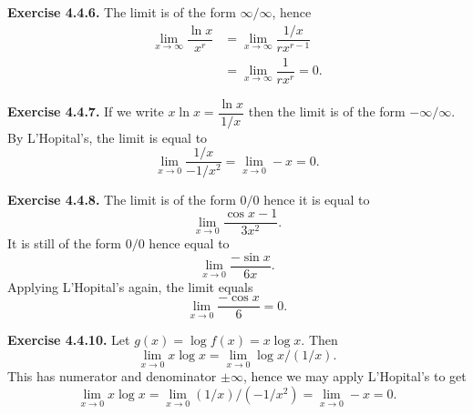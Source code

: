 \documentclass[12pt]{book}
\newenvironment{exercise}[2][Exercise]{\begin{trivlist}
\item[\hskip \labelsep {\bfseries #1}\hskip \labelsep {\bfseries #2.}]}{\end{trivlist}}
\newcommand{\prb}[1]{\textbf{Exercise #1.}}
\begin{document}
\begin{exercise}{4.4.5}
\end{exercise}



\prb{4.4.6} The limit is of the form $\infty/\infty$, hence \begin{align*}
\lim_{x \rightarrow \infty} \dfrac{\ln x}{x^r} & = \lim_{x \rightarrow \infty} \dfrac{1/x}{rx^{r-1}} \\
& = \lim_{x \rightarrow \infty} \dfrac{1}{rx^{r}} = 0. \end{align*}

\prb{4.4.7} If we write $x \ln x = \dfrac{\ln x}{1/x}$ then the limit is of the form $-\infty/\infty$. By L'Hopital's, the limit is equal to $$\lim_{x \rightarrow 0} \dfrac{1/x}{-1/x^2} = \lim_{x \rightarrow 0} -x = 0.$$

\prb{4.4.8} The limit is of the form $0/0$ hence it is equal to $$\lim_{x \rightarrow 0} \dfrac{\cos x - 1}{3x^2}.$$ It is still of the form $0/0$ hence equal to $$\lim_{x \rightarrow 0} \dfrac{-\sin x }{6x}.$$ Applying L'Hopital's again, the limit equals $$\lim_{x \rightarrow 0} \dfrac{-\cos x }{6} = 0.$$



\begin{exercise}{4.4.9}
\end{exercise}


\prb{4.4.10} Let $g(x) = \log f(x) = x \log x.$ Then $$\lim_{x \rightarrow 0} x \log x = \lim_{x \rightarrow 0} \log x /(1/x).$$ This has numerator and denominator $\pm \infty$, hence we may apply L'Hopital's to get $$\lim_{x \rightarrow 0} x \log x = \lim_{x \rightarrow 0} (1/x)/(-1/x^2) = \lim_{x \rightarrow 0} - x = 0.$$


\begin{exercise}{4.4.11}
\end{exercise}

\begin{exercise}{4.4.12}
\end{exercise}


\begin{exercise}{4.4.13}
\end{exercise}


\begin{exercise}{4.4.14}
\end{exercise}

\begin{exercise}{4.4.15}
\end{exercise}

\begin{exercise}{4.4.16}
\end{exercise}
\end{document}
